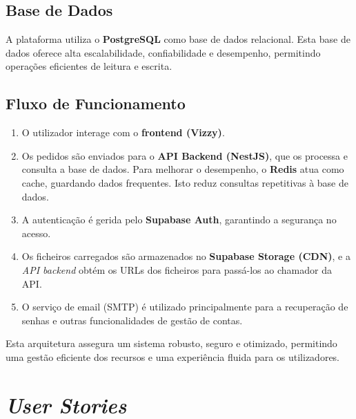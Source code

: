 \documentclass[a4paper, 12pt]{article} %
\begin{document}
\subsection{Base de Dados}
A plataforma utiliza o \textbf{PostgreSQL} como base de dados relacional. Esta base de dados oferece alta escalabilidade, confiabilidade e desempenho, permitindo operações eficientes de leitura e escrita.

\subsection{Fluxo de Funcionamento}
\begin{enumerate}
	\item O utilizador interage com o \textbf{frontend (Vizzy)}.
	\item Os pedidos são enviados para o \textbf{API Backend (NestJS)}, que os processa e consulta a base de dados. Para melhorar o desempenho, o \textbf{Redis} atua como cache, guardando dados frequentes. Isto reduz consultas repetitivas à base de dados.
	\item A autenticação é gerida pelo \textbf{Supabase Auth}, garantindo a segurança no acesso.
	\item Os ficheiros carregados são armazenados no \textbf{Supabase Storage (CDN)}, e a \textit{API backend} obtém os URLs dos ficheiros para passá-los ao chamador da API.
	\item O serviço de email (SMTP) é utilizado principalmente para a recuperação de senhas e outras funcionalidades de gestão de contas.
\end{enumerate}

Esta arquitetura assegura um sistema robusto, seguro e otimizado, permitindo uma gestão eficiente dos recursos e uma experiência fluida para os utilizadores.



\newpage
\section{\textit{User Stories}}
\end{document}
